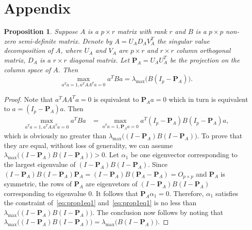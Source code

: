 \documentclass[12pt]{article} %
\newcommand{\bP}{\mathbf{P}}
\newtheorem{proposition}{Proposition}
\theoremstyle{definition}
\begin{document}





\section*{Appendix}

\begin{proposition}\label{optProp}
    Suppose $A$ is a $p\times r$ matrix with rank $r$ and $B$ is a $p\times p$  non-zero semi-definite matrix.
    Denote by $A=U_A D_A V_A^T$ the singular value decomposition of $A$, where $U_A$ and $V_A$ are $p\times r$ and $r\times r$ column orthogonal matrix, $D_A$ is a $r\times r$ diagonal matrix.
    Let $\bP_A=U_A U_A^T$ be the projection on the column space of $A$.
    Then
    \begin{equation}
        \max_{a^T a=1, a^T A A^T a=0}a^T B a=
        \lambda_{\max}\big(B(I_p-\bP_A)\big).
    \end{equation}
\end{proposition}
\begin{proof}
    Note that $a^T A A^T a=0$ is equivalent to $\bP_A a=0$ which in turn is equivalent to $a= (I_p-\bP_A)a$.
    Then
    \begin{equation}\label{eq:prop1eq1}
        \begin{aligned}
        \max_{a^T a=1, a^T A A^T a=0}a^T B a
            &=
        \max_{a^T a=1, \bP_A a=0}a^T(I_p-\bP_A) B (I_p-\bP_A)a,
        \end{aligned}
    \end{equation}
    which is obviously no greater than $\lambda_{\max}\big((I-\bP_A)B(I-\bP_A)\big)$.
    To prove that they are equal,  without loss of generality, we can assume $\lambda_{\max}\big((I-\bP_A)B(I-\bP_A)\big)>0$.
    Let $\alpha_1$ be one eigenvector corresponding to the largest eigenvalue of $(I-\bP_A)B(I-\bP_A)$.
    Since $(I-\bP_A)B(I-\bP_A)\bP_A=(I-\bP_A)B(\bP_A-\bP_A)=O_{p\times p}$ and $\bP_A$ is symmetric, the rows of $\bP_A$ are eigenvetors of $(I-\bP_A)B(I-\bP_A)$ corresponding to eigenvalue $0$.
    It follows that $\bP_A\alpha_1=0$.
    Therefore, $\alpha_1$ satisfies the constraint of~\eqref{eq:prop1eq1} and~\eqref{eq:prop1eq1} is no less than $\lambda_{\max}\big((I-\bP_A)B(I-\bP_A)\big)$.
    The conclusion now follows by noting that $\lambda_{\max}\big((I-\bP_A)B(I-\bP_A)\big)=\lambda_{\max}\big( B(I-\bP_A)\big)$.
    
\end{proof}
\end{document}
